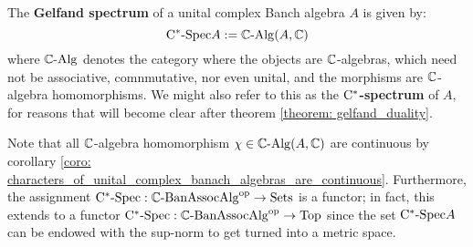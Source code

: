             \begin{definition} \label{def: gelfand_spectra}
                The \textbf{Gelfand spectrum} of a unital complex Banch algebra $A$ is given by:
                    $$\mathrm{C}^*\text{-}\mathrm{Spec} A := \mathbb{C}\text{-}\mathrm{Alg}(A, \mathbb{C})$$
                where $\mathbb{C}\text{-}\mathrm{Alg}$ denotes the category where the objects are $\mathbb{C}$-algebras, which need not be associative, comnmutative, nor even unital, and the morphisms are $\mathbb{C}$-algebra homomorphisms. We might also refer to this as the \textbf{$\mathrm{C}^*$-spectrum} of $A$, for reasons that will become clear after theorem \ref{theorem: gelfand_duality}.
            \end{definition}
            \begin{remark}
                Note that all $\mathbb{C}$-algebra homomorphism $\chi \in \mathbb{C}\text{-}\mathrm{Alg}(A, \mathbb{C})$ are continuous by corollary \ref{coro: characters_of_unital_complex_banach_algebras_are_continuous}. Furthermore, the assignment $\mathrm{C}^*\text{-}\mathrm{Spec}: \mathbb{C}\text{-}\mathrm{Ban}\mathrm{Assoc}\mathrm{Alg}^{\mathrm{op}} \to \mathrm{Sets}$ is a functor; in fact, this extends to a functor $\mathrm{C}^*\text{-}\mathrm{Spec}: \mathbb{C}\text{-}\mathrm{Ban}\mathrm{Assoc}\mathrm{Alg}^{\mathrm{op}} \to \mathrm{Top}$ since the set $\mathrm{C}^*\text{-}\mathrm{Spec} A$ can be endowed with the sup-norm to get turned into a metric space. 
            \end{remark}
